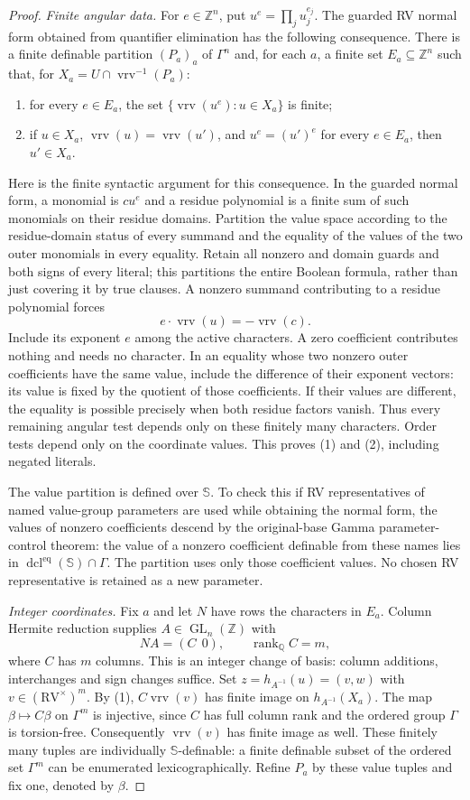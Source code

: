 \documentclass[12pt]{amsart}
\newcommand{\RV}{\mathrm{RV}}
\newcommand{\Z}{\mathds{Z}}
\newcommand{\vrv}{\operatorname{vrv}}
\newcommand{\GL}{\operatorname{GL}}
\newcommand{\dcl}{\operatorname{dcl}}
\newcommand{\Sbase}{\mathbb S}
\numberwithin{equation}{section}
\begin{document}
{\begin{proof}
\emph{Finite angular data.}
For $e\in\Z^n$, put $u^e=\prod_j u_j^{e_j}$.
The guarded RV normal form obtained from quantifier elimination has
the following consequence. There is a finite definable partition
$(P_a)_a$ of $\Gamma^n$ and, for each $a$, a finite set
$E_a\subseteq\Z^n$ such that, for $X_a=U\cap\vrv^{-1}(P_a)$:
\begin{enumerate}
\item for every $e\in E_a$, the set
$\{\vrv(u^e):u\in X_a\}$ is finite;
\item if $u\in X_a$, $\vrv(u)=\vrv(u')$, and
$u^e=(u')^e$ for every $e\in E_a$, then $u'\in X_a$.
\end{enumerate}
Here is the finite syntactic argument for this consequence.
In the guarded normal form, a monomial is $c u^e$ and a residue
polynomial is a finite sum of such monomials on their residue
domains. Partition the value space according to the residue-domain
status of every summand and the equality of the values of the two
outer monomials in every equality. Retain all nonzero and domain
guards and both signs of every literal; this partitions the entire
Boolean formula, rather than just covering it by true clauses.
A nonzero summand contributing to a residue polynomial forces
\[
 e\cdot\vrv(u)=-\vrv(c).
\]
Include its exponent $e$ among the active characters. A zero
coefficient contributes nothing and needs no character.
In an equality whose two nonzero outer coefficients have the same
value, include the difference of their exponent vectors: its value
is fixed by the quotient of those coefficients. If their values are
different, the equality is possible precisely when both residue
factors vanish. Thus every remaining angular test depends only on
these finitely many characters. Order tests depend only on the
coordinate values. This proves (1) and (2), including negated
literals.

The value partition is defined over $\Sbase$. To check this if RV
representatives of named value-group parameters are used while
obtaining the normal form, the values of nonzero coefficients
descend by the original-base Gamma parameter-control theorem:
the value of a nonzero coefficient definable from these names
lies in $\dcl^{\mathrm{eq}}(\Sbase)\cap\Gamma$.
The partition uses only those coefficient values. No chosen
RV representative is retained as a new parameter.

\emph{Integer coordinates.}
Fix $a$ and let $N$ have rows the characters in $E_a$.
Column Hermite reduction supplies $A\in\GL_n(\Z)$ with
\[
 NA=(C\ \ 0),\qquad \operatorname{rank}_{\mathbb Q}C=m,
\]
where $C$ has $m$ columns. This is an integer change of basis:
column additions, interchanges and sign changes suffice.
Set $z=h_{A^{-1}}(u)=(v,w)$ with $v\in(\RV^\times)^m$.
By (1), $C\vrv(v)$ has finite image on $h_{A^{-1}}(X_a)$.
The map $\beta\mapsto C\beta$ on $\Gamma^m$ is injective, since
$C$ has full column rank and the ordered group $\Gamma$ is
torsion-free. Consequently $\vrv(v)$ has finite image as well.
These finitely many tuples are individually $\Sbase$-definable:
a finite definable subset of the ordered set $\Gamma^m$ can be
enumerated lexicographically. Refine $P_a$ by these value tuples
and fix one, denoted by $\beta$.


\end{proof}}
\end{document}
